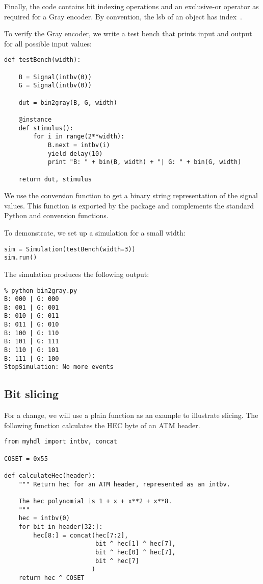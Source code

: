 Finally, the code contains bit indexing operations and an exclusive-or
operator as required for a Gray encoder. By convention, the lsb of an
 object has index~.

To verify the Gray encoder, we write a test bench that prints input
and output for all possible input values:

\begin{verbatim}
def testBench(width):
    
    B = Signal(intbv(0))
    G = Signal(intbv(0))
    
    dut = bin2gray(B, G, width)

    @instance
    def stimulus():
        for i in range(2**width):
            B.next = intbv(i)
            yield delay(10)
            print "B: " + bin(B, width) + "| G: " + bin(G, width)

    return dut, stimulus
\end{verbatim}

We use the conversion function  to get a binary
string representation of the signal values. This function is exported
by the  package and complements the standard Python
 and  conversion functions.

To demonstrate, we set up a simulation for a small width: 

\begin{verbatim}
sim = Simulation(testBench(width=3))
sim.run()
\end{verbatim}

The simulation produces the following output:

\begin{verbatim}
% python bin2gray.py
B: 000 | G: 000
B: 001 | G: 001
B: 010 | G: 011
B: 011 | G: 010
B: 100 | G: 110
B: 101 | G: 111
B: 110 | G: 101
B: 111 | G: 100
StopSimulation: No more events
\end{verbatim}

\subsection{Bit slicing \label{intro-slicing}}

For a change, we will use a plain function as an example to illustrate
slicing.  The following function calculates the HEC byte of an ATM
header.

\begin{verbatim}
from myhdl import intbv, concat

COSET = 0x55

def calculateHec(header):
    """ Return hec for an ATM header, represented as an intbv.

    The hec polynomial is 1 + x + x**2 + x**8.
    """
    hec = intbv(0)
    for bit in header[32:]:
        hec[8:] = concat(hec[7:2],
                         bit ^ hec[1] ^ hec[7],
                         bit ^ hec[0] ^ hec[7],
                         bit ^ hec[7]
                        )
    return hec ^ COSET
\end{verbatim}

